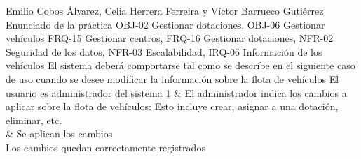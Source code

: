 {Emilio Cobos Álvarez, Celia Herrera Ferreira y Víctor Barrueco Gutiérrez}
{Enunciado de la práctica}
{OBJ-02 Gestionar dotaciones, OBJ-06 Gestionar vehículos}
{FRQ-15 Gestionar centros, FRQ-16 Gestionar dotaciones, NFR-02 Seguridad de los datos, NFR-03 Escalabilidad, IRQ-06 Información de los vehículos}
{El sistema deberá comportarse tal como se describe en el siguiente caso de uso cuando se desee modificar la información sobre la flota de vehículos}
{El usuario es administrador del sistema}
{
1 & El administrador indica los cambios a aplicar sobre la flota de vehículos: Esto incluye crear, asignar a una dotación, eliminar, etc. \\  & Se aplican los cambios \\
}
{Los cambios quedan correctamente registrados}
{}

